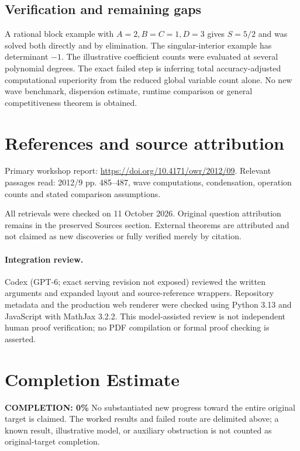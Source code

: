 \documentclass[11pt]{article}
\begin{document}
\subsection{Verification and remaining gaps}
A rational block example with $A=2,B=C=1,D=3$ gives $S=5/2$ and was solved both directly and by elimination. The singular-interior example has determinant $-1$. The illustrative coefficient counts were evaluated at several polynomial degrees. The exact failed step is inferring total accuracy-adjusted computational superiority from the reduced global variable count alone. No new wave benchmark, dispersion estimate, runtime comparison or general competitiveness theorem is obtained.

\section{References and source attribution}
Primary workshop report: \url{https://doi.org/10.4171/owr/2012/09}. Relevant passages read: 2012/9 pp. 485--487, wave computations, condensation, operation counts and stated comparison assumptions.

All retrievals were checked on 11 October 2026. Original question attribution remains in the preserved Sources section. External theorems are attributed and not claimed as new discoveries or fully verified merely by citation.


\paragraph{Integration review.} Codex (GPT-6; exact serving revision not exposed) reviewed the written arguments and expanded layout and source-reference wrappers. Repository metadata and the production web renderer were checked using Python 3.13 and JavaScript with MathJax 3.2.2. This model-assisted review is not independent human proof verification; no PDF compilation or formal proof checking is asserted.

\section{Completion Estimate}
\noindent\textbf{COMPLETION: 0\%}
No substantiated new progress toward the entire original target is claimed. The worked results and failed route are delimited above; a known result, illustrative model, or auxiliary obstruction is not counted as original-target completion.
\end{document}
